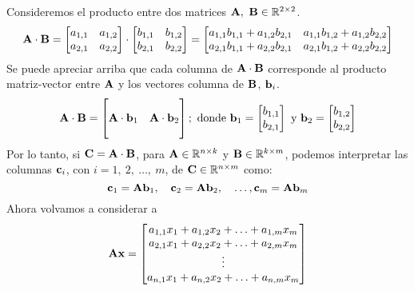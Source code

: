 \documentclass[12pt]{article}
\begin{document}
Consideremos el producto entre dos matrices $\mathbf{A}, \ \mathbf{B} \in \mathbb{R}^{2 \times 2}$.
\[
\mathbf{A} \cdot \mathbf{B} =
\begin{bmatrix}
a_{1, 1} & a_{1, 2} \\
a_{2, 1} & a_{2, 2}
\end{bmatrix} \cdot
\begin{bmatrix}
b_{1, 1} & b_{1, 2} \\
b_{2, 1} & b_{2, 2}
\end{bmatrix} =
\begin{bmatrix}
a_{1, 1}b_{1, 1} + a_{1, 2}b_{2, 1} & a_{1, 1}b_{1, 2} + a_{1, 2}b_{2, 2} \\
a_{2, 1}b_{1, 1} + a_{2, 2}b_{2, 1} & a_{2, 1}b_{1, 2} + a_{2, 2}b_{2, 2}
\end{bmatrix}
\]
Se puede apreciar arriba que cada columna de $\mathbf{A} \cdot \mathbf{B}$ corresponde al producto matriz-vector entre $\mathbf{A}$ y los vectores columna de $\mathbf{B}$, $\mathbf{b}_{i}$.
\[
\mathbf{A} \cdot \mathbf{B} =
\begin{bmatrix}
 & \\
\mathbf{A} \cdot \mathbf{b}_{1} & \mathbf{A} \cdot \mathbf{b}_{2} \\
 & 
\end{bmatrix}; \text{ donde }
\mathbf{b}_{1} =
\begin{bmatrix}
b_{1, 1} \\ b_{2, 1}
\end{bmatrix} \text{ y }
\mathbf{b}_{2} =
\begin{bmatrix}
b_{1, 2} \\ b_{2, 2}
\end{bmatrix}
\]
Por lo tanto, si $\mathbf{C} = \mathbf{A} \cdot \mathbf{B}$, para $\mathbf{A} \in \mathbb{R}^{n \times k}$ y $\mathbf{B} \in \mathbb{R}^{k \times m}$, podemos interpretar las columnas $\mathbf{c}_{i}$, con $i = 1, \ 2 , \ \ldots, \ m$, de $\mathbf{C} \in \mathbb{R}^{n \times m}$ como:
\[
  \mathbf{c}_{1} = \mathbf{A} \mathbf{b}_{1}, \quad
  \mathbf{c}_{2} = \mathbf{A} \mathbf{b}_{2}, \quad \ldots,
  \mathbf{c}_{m} = \mathbf{A} \mathbf{b}_{m}
\]
Ahora volvamos a considerar a
\[
\mathbf{A}\mathbf{x} =
\begin{bmatrix}
a_{1, 1}x_{1} + a_{1, 2}x_{2} + \ldots + a_{1, m}x_{m} \\
a_{2, 1}x_{1} + a_{2, 2}x_{2} + \ldots + a_{2, m}x_{m} \\
\vdots \\
a_{n, 1}x_{1} + a_{n, 2}x_{2} + \ldots + a_{n, m}x_{m}
\end{bmatrix}
\]
\end{document}
